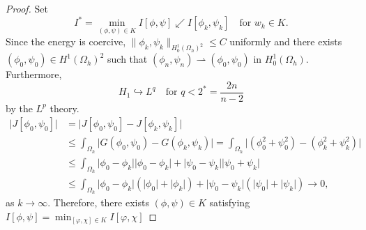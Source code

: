 \documentclass[11pt]{amsart}
\numberwithin{equation}{section}
\theoremstyle{plain}
\theoremstyle{definition}
\begin{document}
\begin{proof}
	Set
	\begin{equation*}
		I^*=\min_{(\phi,\psi)\in K}I[\phi,\psi] \swarrow I[\phi_k,\psi_k] \quad \text{for } w_k\in K.
	\end{equation*}
	Since the energy is coercive, $\lVert \phi_k, \psi_k \rVert_{H_0^1(\Omega_h)^2}\leq C$ uniformly and there exists $(\phi_0,\psi_0)\in H^1(\Omega_h)^2$ such that $(\phi_n,\psi_n) \rightharpoonup(\phi_0,\psi_0)$ in $H_0^1(\Omega_h)$.
	Furthermore, 
	\begin{equation*}
		H_1\hookrightarrow L^q \quad \text{for }q<2^*=\frac{2n}{n-2}
	\end{equation*}
	by the $L^p$ theory.
	\begin{equation*}
	\begin{aligned}
		\lvert J[\phi_0,\psi_0] \rvert &= \lvert J[\phi_0,\psi_0]-J[\phi_k,\psi_k]\rvert \\
		&\leq \int_{\Omega_h}\lvert G(\phi_0,\psi_0)-G(\phi_k,\psi_k)\rvert=\int_{\Omega_h}\lvert(\phi_0^2+\psi_0^2)-(\phi_k^2+\psi_k^2)\rvert\\
		&\leq \int_{\Omega_h}\lvert\phi_0-\phi_k\rvert \lvert \phi_0-\phi_k \rvert + \lvert \psi_0 - \psi_k \rvert \lvert \psi_0 + \psi_k \rvert\\
		&\leq \int_{\Omega _h} \lvert \phi_0 - \phi_k \rvert (\lvert \phi_0 \rvert + \lvert \phi_k \rvert) + \lvert \psi_0-\psi_k \rvert (\lvert \psi_0 \rvert + \lvert \psi_k \rvert) \to 0,
	\end{aligned}
	\end{equation*}
	as $k \to \infty$. Therefore, there exists $(\phi, \psi) \in K$ satisfying $\displaystyle I[\phi, \psi]=\min_{[\varphi, \chi] \in K}I[\varphi, \chi]$
\end{proof}
\end{document}
